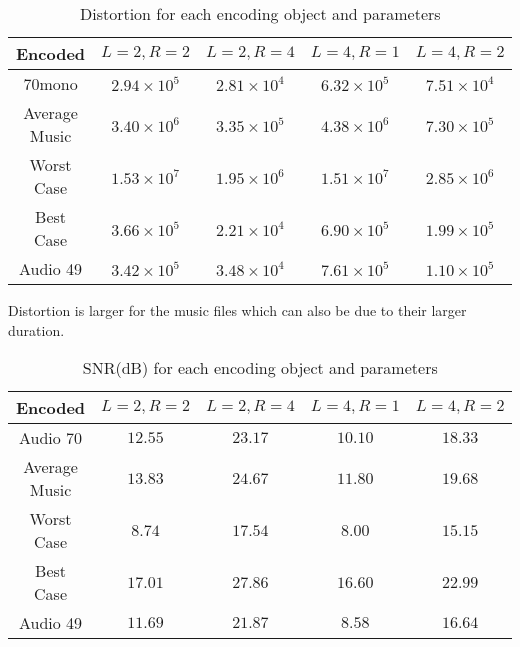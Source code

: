 \documentclass[a4paper, 11pt]{article}
\begin{document}
			\begin{table}[H]
				\centering
				\begin{tabular}{c|c|c|c|c}
					\textbf{Encoded} & \textbf{$ L=2, R=2 $} 	& \textbf{$ L=2, R=4 $}	&  \textbf{$ L=4, R=1 $}	& \textbf{$ L=4, R=2 $} \\ \hline
					70mono			& $ 2.94 \times 10^{5} $ 	& $ 2.81 \times 10^{4} $& $ 6.32 \times 10^{5} $ 	& $ 7.51 \times 10^{4} $ \\ \hline
					Average Music	& $ 3.40 \times 10^{6} $ 	& $ 3.35 \times 10^{5} $& $ 4.38 \times 10^{6} $  	& $ 7.30 \times 10^{5} $ \\ \hline	
					Worst Case 		& $ 1.53 \times 10^{7} $	& $	1.95 \times 10^{6} $& $ 1.51 \times 10^{7} $	& $ 2.85 \times 10^6 $ \\ \hline
					Best Case 		& $ 3.66 \times 10^{5} $	& $ 2.21 \times 10^{4} $& $ 6.90 \times 10^{5} $ 	& $	1.99 \times 10^5 $ \\ \hline
					Audio 49		& $ 3.42 \times 10^{5} $	& $ 3.48 \times 10^{4} $& $ 7.61 \times 10^{5} $ 	& $ 1.10 \times 10^{5} $	\\
				\end{tabular}
				\caption{Distortion for each encoding object and parameters}
				\label{table:EncodeDist}
			\end{table}		
			Distortion is larger for the music files which can also be due to their larger duration.		
			
			\begin{table}[H]
				\centering
				\begin{tabular}{c|c|c|c|c}
					\textbf{Encoded} 	& \textbf{$ L=2, R=2 $} 	& \textbf{$ L=2, R=4 $}	&  \textbf{$ L=4, R=1 $}	& \textbf{$ L=4, R=2 $} \\ \hline
					Audio 70			& $ 12.55 $ 	& $  23.17 $	& $ 10.10 $		& $ 18.33 $ 	\\ \hline
					Average Music		& $ 13.83 $ 	& $  24.67  $	& $ 11.80 $  	& $ 19.68 $ 	\\ \hline	
					Worst Case 			& $ 8.74 $		& $	 17.54 $	& $ 8.00 $		& $ 15.15  $ 	\\ \hline
					Best Case 			& $ 17.01 $		& $ 27.86 $		& $ 16.60 $ 	& $	22.99  $ 	\\ \hline
					Audio 49 			& $ 11.69 $		& $ 21.87  $	& $ 8.58 $ 		& $	16.64  $ 	\\
				\end{tabular}
				\caption{SNR(dB) for each encoding object and parameters}
				\label{table:EncodeSNR}
			\end{table}
		
\end{document}

